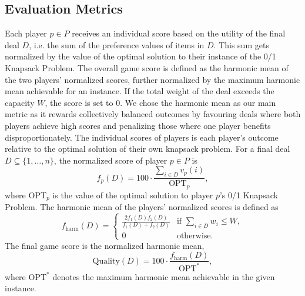 \documentclass[../main.tex]{subfiles}
\begin{document}
\subsection{Evaluation Metrics}\label{subsec:appendix_balloon_metrics}

Each player $p \in P$ receives an individual score based on the utility of the final deal $D$, i.e. the sum of the preference values of items in $D$. This sum gets normalized by the value of the optimal solution to their instance of the 0/1 Knapsack Problem. The overall game score is defined as the harmonic mean of the two players’ normalized scores, further normalized by the maximum harmonic mean achievable for an instance. If the total weight of the deal exceeds the capacity $W$, the score is set to $0$. We chose the harmonic mean as our main metric as it rewards collectively balanced outcomes by favouring deals where both players achieve high scores and penalizing those where one player benefits disproportionately. 
The individual scores of players is each player’s outcome relative to the optimal solution of their own knapsack problem. For a final deal $D \subseteq \{1,\dots,n\}$, the normalized score of player $p \in P$ is  
$$
f_p(D) = 100 \cdot \frac{\sum_{i \in D} v_p(i)}{\text{OPT}_p},
$$  
where $\text{OPT}_p$ is the value of the optimal solution to player $p$'s 0/1 Knapsack Problem.  
The harmonic mean of the players' normalized scores is defined as  
$$
f_{\text{harm}}(D) =
\begin{cases}
\frac{2 f_{1}(D) f_{2}(D)}{f_{1}(D) + f_{2}(D)} & \text{if } \sum_{i \in D} w_i \leq W, \\
0 & \text{otherwise}.
\end{cases}
$$  
The final game score is the normalized harmonic mean, 
$$
\text{Quality}(D) = 100 \cdot \frac{f_{\text{harm}}(D)}{\text{OPT}^*},
$$  
where $\text{OPT}^*$ denotes the maximum harmonic mean achievable in the given instance.
\end{document}
